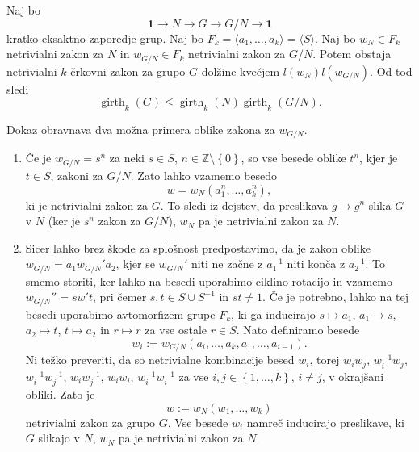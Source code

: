 \documentclass[mat1, tisk]{fmfdelo}
\numberwithin{equation}{section}  %
\begin{document}
\begin{lema}\label{lem_razsiritvena_lema}
    Naj bo \begin{equation*}
        \mathbf{1} \to N \to G \to G / N \to  \mathbf{1}  
    \end{equation*}  
    kratko eksaktno zaporedje grup. Naj bo $F_k = \langle a_1, \ldots, a_k \rangle  = \langle S \rangle$. Naj bo $w_N \in F_k$ netrivialni zakon za $N$ in $w_{ G / N} \in  F_k$ netrivialni zakon za $G / N$. 
    Potem obstaja netrivialni $k$-črkovni zakon za grupo $G$ dolžine kvečjem $l(w_N) l( w_{ G / N } )$. Od tod sledi \begin{equation*}
    \operatorname{girth}_{k}(G) \le \operatorname{girth}_{k}(N) \operatorname{girth}_{k}( G / N ). 
    \end{equation*}  
\end{lema}
\begin{dokaz}
    Dokaz obravnava dva možna primera oblike zakona za $w_{ G / N }$. 
    \begin{enumerate}
        \item Če je $w_{ G / N } = s^{n}$ za neki $s \in S$, $n \in  \mathbb{Z} \setminus \left\{ 0\right\} $, so vse besede oblike $t^{n}$, kjer je $t \in S$, zakoni za $G / N$. Zato lahko vzamemo besedo \begin{equation*}
        w = w_N(a_1^{n}, \ldots, a_{k}^{n}),
        \end{equation*}  
        ki je netrivialni zakon za $G$. To sledi iz dejstev, da preslikava $g \mapsto g^{n}$ slika $G$ v $N$ (ker je $s^{n}$ zakon za $G / N$), $w_N$ pa je netrivialni zakon za $N$.    
    \item Sicer lahko brez škode za splošnost predpostavimo, da je zakon oblike $w_{ G / N} = a_1 w_{ G / N}' a_2$, kjer se $w_{ G / N}'$ niti ne začne z $a_1^{-1}$ niti konča z $a_2^{-1}$. To smemo storiti, ker lahko na besedi uporabimo ciklino rotacijo in vzamemo 
    $w_{ G / N}'' = s w' t$, pri čemer $s, t \in  S \cup  S^{-1}$ in $st \neq 1$. Če je potrebno, lahko na tej besedi uporabimo avtomorfizem grupe $F_k$, ki ga inducirajo $s \mapsto a_1$, $a_1 \to s$, $a_2 \mapsto t$, $t \mapsto a_2$ in $r \mapsto r$ za vse ostale $r \in S$.  
   Nato definiramo besede \begin{equation*}
   w_i := w_{ G / N}(a_{i}, \ldots, a_{k}, a_1, \ldots, a_{i - 1}). 
   \end{equation*}  
   Ni težko preveriti, da so netrivialne kombinacije besed $w_i$, torej $w_{i} w_{j}$, $w_{i}^{-1} w_{j}$, $w_{i}^{-1} w_{j}^{-1}$, $w_{i} w_{j}^{-1}$, $w_{i} w_{i}$, $w_{i}^{-1} w_{i}^{-1}$ za vse $i,j \in \left\{ 1, \ldots, k \right\}, \, i \neq j$, v okrajšani obliki.
   Zato je \begin{equation*}
   w := w_N (w_1, \ldots, w_{k})
   \end{equation*}  
    netrivialni zakon za grupo $G$. Vse besede $w_{i}$ namreč inducirajo preslikave, ki $G$ slikajo v $N$, $w_N$ pa je netrivialni zakon za $N$.       
    \end{enumerate}
\end{dokaz}
\end{document}
